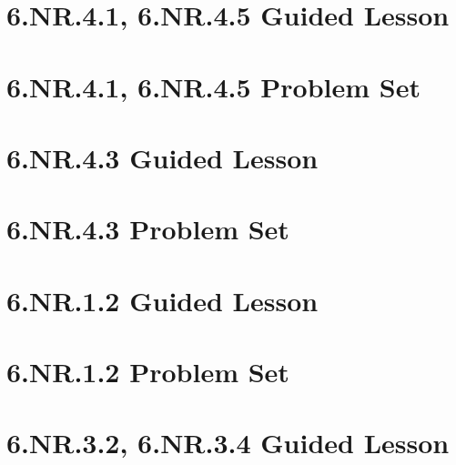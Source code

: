 \documentclass[a4paper,12pt]{article}
\title{}
\date{}
\begin{document}


\hypertarget{toc}{}  %
\tableofcontents
\newpage



\pagestyle{fancy}  %
\newpage
\section{6.NR.4.1, 6.NR.4.5 Guided Lesson}


\newpage
\section{6.NR.4.1, 6.NR.4.5 Problem Set}


\newpage
\section{6.NR.4.3 Guided Lesson}


\newpage
\section{6.NR.4.3 Problem Set}


\newpage
\section{6.NR.1.2 Guided Lesson}


\newpage
\section{6.NR.1.2 Problem Set}


\newpage
\section{6.NR.3.2, 6.NR.3.4 Guided Lesson}

\end{document}
